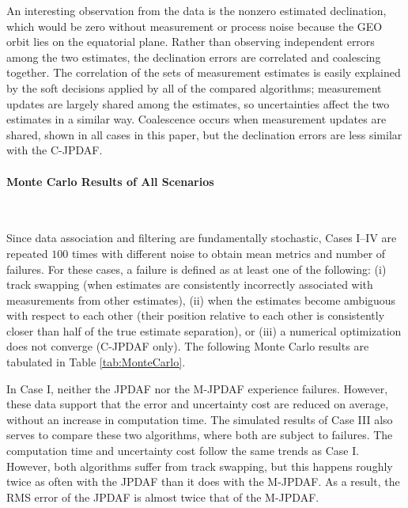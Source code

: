 An interesting observation from the data is the nonzero estimated declination, which would be zero without measurement or process noise because the GEO orbit lies on the equatorial plane.
Rather than observing independent errors among the two estimates, the declination errors are correlated and coalescing together.
The correlation of the sets of measurement estimates is easily explained by the soft decisions applied by all of the compared algorithms; measurement updates are largely shared among the estimates, so uncertainties affect the two estimates in a similar way.
Coalescence occurs when measurement updates are shared, shown in all cases in this paper, but the declination errors are less similar with the C-JPDAF.


















\paragraph*{Monte Carlo Results of All Scenarios}\ 

Since data association and filtering are fundamentally stochastic, Cases I--IV are repeated $100$ times with different noise to obtain mean metrics and number of failures.
For these cases, a failure is defined as at least one of the following: (i) track swapping (when estimates are consistently incorrectly associated with measurements from other estimates), (ii) when the estimates become ambiguous with respect to each other (their position relative to each other is consistently closer than half of the true estimate separation), or (iii) a numerical optimization does not converge (C-JPDAF only).
The following Monte Carlo results are tabulated in Table \ref{tab:MonteCarlo}.

In Case I, neither the JPDAF nor the M-JPDAF experience failures.
However, these data support that the error and uncertainty cost are reduced on average, without an increase in computation time.
The simulated results of Case III also serves to compare these two algorithms, where both are subject to failures.
The computation time and uncertainty cost follow the same trends as Case I.
However, both algorithms suffer from track swapping, but this happens roughly twice as often with the JPDAF than it does with the M-JPDAF. As a result, the RMS error of the JPDAF is almost twice that of the M-JPDAF.

